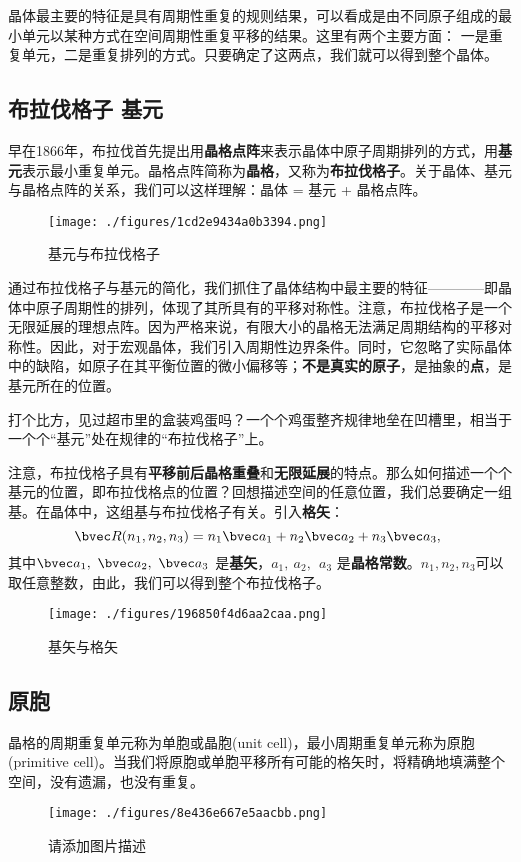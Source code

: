 
晶体最主要的特征是具有周期性重复的规则结果，可以看成是由不同原子组成的最小单元以某种方式在空间周期性重复平移的结果。这里有两个主要方面：
一是重复单元，二是重复排列的方式。只要确定了这两点，我们就可以得到整个晶体。

\subsection{布拉伐格子 基元}
早在1866年，布拉伐首先提出用\textbf{晶格点阵}来表示晶体中原子周期排列的方式，用\textbf{基元}表示最小重复单元。晶格点阵简称为\textbf{晶格}，又称为\textbf{布拉伐格子}。关于晶体、基元与晶格点阵的关系，我们可以这样理解：晶体 = 基元 + 晶格点阵。
\begin{figure}[ht]
\centering
\texttt{[image: ./figures/1cd2e9434a0b3394.png]}
\caption{ 基元与布拉伐格子} \label{fig_BraLat_1}
\end{figure}

通过布拉伐格子与基元的简化，我们抓住了晶体结构中最主要的特征————即晶体中原子周期性的排列，体现了其所具有的平移对称性。注意，布拉伐格子是一个无限延展的理想点阵。因为严格来说，有限大小的晶格无法满足周期结构的平移对称性。因此，对于宏观晶体，我们引入周期性边界条件。同时，它忽略了实际晶体中的缺陷，如原子在其平衡位置的微小偏移等；\textbf{不是真实的原子}，是抽象的\textbf{点}，是基元所在的位置。

打个比方，见过超市里的盒装鸡蛋吗？一个个鸡蛋整齐规律地垒在凹槽里，相当于一个个“基元”处在规律的“布拉伐格子”上。

注意，布拉伐格子具有\textbf{平移前后晶格重叠}和\textbf{无限延展}的特点。那么如何描述一个个基元的位置，即布拉伐格点的位置？回想描述空间的任意位置，我们总要确定一组基。在晶体中，这组基与布拉伐格子有关。引入\textbf{格矢}：
\begin{equation}
\bvec R(n_1, n_2, n_3) = n_1 \bvec a_1 + n_2 \bvec a_2 + n_3 \bvec a_3,~ 
\end{equation}
其中$\bvec a_1,~\bvec a_2,~\bvec a_3$ 是\textbf{基矢}，$a_1,~ a_2,~\ a_3$ 是\textbf{晶格常数}。$n_1, n_2, n_3$可以取任意整数，由此，我们可以得到整个布拉伐格子。

\begin{figure}[ht]
\centering
\texttt{[image: ./figures/196850f4d6aa2caa.png]}
\caption{基矢与格矢} \label{fig_BraLat_2}
\end{figure}

\subsection{原胞}
晶格的周期重复单元称为单胞或晶胞(unit cell)，最小周期重复单元称为原胞(primitive cell)。当我们将原胞或单胞平移所有可能的格矢时，将精确地填满整个空间，没有遗漏，也没有重复。

\begin{figure}[ht]
\centering
\texttt{[image: ./figures/8e436e667e5aacbb.png]}
\caption{请添加图片描述} \label{fig_BraLat_3}
\end{figure}
